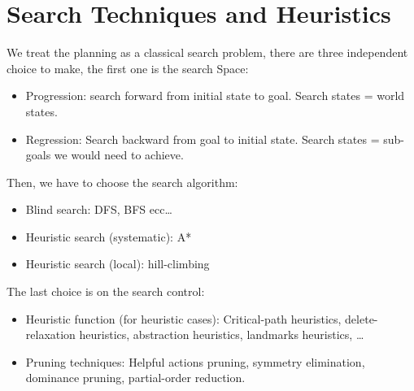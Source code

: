 \documentclass[10pt, letterpaper]{report}
\begin{document}
 \chapter{Search Techniques and Heuristics}
 We treat the planning as a classical search problem, there are three independent choice to make, the first one is  the search Space:\begin{itemize}
    \item Progression: search forward from initial state to goal. Search states = world states.
    \item Regression: Search backward from goal to initial state.
   Search states = sub-goals we would need to achieve.
 \end{itemize}
 Then, we have to choose the search algorithm:\begin{itemize}
    \item Blind search: DFS, BFS ecc\dots
    \item Heuristic search (systematic): A* 
    \item Heuristic search (local): hill-climbing
 \end{itemize}
 The last choice is on the search control:\begin{itemize}
    \item Heuristic function (for heuristic cases): Critical-path heuristics, delete-relaxation heuristics, abstraction
 heuristics, landmarks heuristics, \dots 
 \item Pruning techniques: Helpful actions pruning, symmetry elimination, dominance
 pruning, partial-order reduction.
 \end{itemize}
\end{document}
